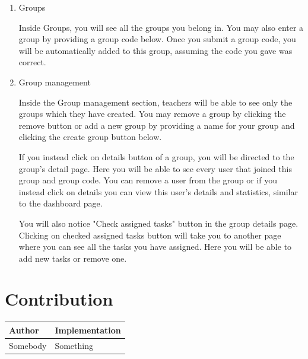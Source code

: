 \documentclass[singlespacing,12pt,parskip,headsepline,consistentlayout]{article}
\begin{document}
\begin{enumerate}
    \item Groups

    Inside Groups, you will see all the groups you belong in. You may also enter a group by providing a group code below. Once you submit a group code, you will be automatically added to this group, assuming the code you gave was correct.
    
    \item Group management

    Inside the Group management section, teachers will be able to see only the groups which they have created. You may remove a group by clicking the remove button or add a new group by providing a name for your group and clicking the create group button below.

    If you instead click on details button of a group, you will be directed to the group's detail page. Here you will be able to see every user that joined this group and group code. You can remove a user from the group or if you instead click on details you can view this user's details and statistics, similar to the dashboard page.

    You will also notice "Check assigned tasks" button in the group details page. Clicking on checked assigned tasks button will take you to another page where you can see all the tasks you have assigned. Here you will be able to add new tasks or remove one.
    
\end{enumerate}

\pagebreak
\section{Contribution}
\begin{tabular}{ |p{4cm}|p{9cm}|  }
\hline
\bf{Author}& \bf{Implementation} \\
\hline
Somebody& Something\\ 
\hline
\end{tabular}

\pagebreak
\printbibliography
\end{document}
